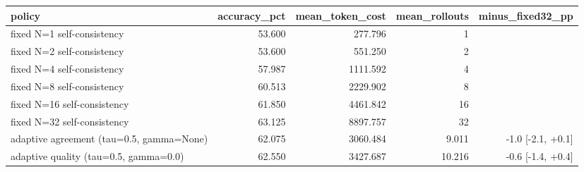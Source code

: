 \begin{tabular}{lrrrr}
\toprule
policy & accuracy\_pct & mean\_token\_cost & mean\_rollouts & minus\_fixed32\_pp \\
\midrule
fixed N=1 self-consistency & 53.600 & 277.796 & 1 &  \\
fixed N=2 self-consistency & 53.600 & 551.250 & 2 &  \\
fixed N=4 self-consistency & 57.987 & 1111.592 & 4 &  \\
fixed N=8 self-consistency & 60.513 & 2229.902 & 8 &  \\
fixed N=16 self-consistency & 61.850 & 4461.842 & 16 &  \\
fixed N=32 self-consistency & 63.125 & 8897.757 & 32 &  \\
adaptive agreement (tau=0.5, gamma=None) & 62.075 & 3060.484 & 9.011 & -1.0 [-2.1, +0.1] \\
adaptive quality (tau=0.5, gamma=0.0) & 62.550 & 3427.687 & 10.216 & -0.6 [-1.4, +0.4] \\
\bottomrule
\end{tabular}
